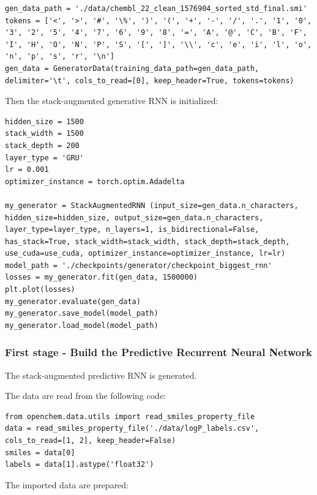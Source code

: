\documentclass[a4paper]{article}
\begin{document}
\begin{lstlisting}
gen_data_path = './data/chembl_22_clean_1576904_sorted_std_final.smi'
tokens = ['<', '>', '#', '\%', ')', '(', '+', '-', '/', '.', '1', '0', '3', '2', '5', '4', '7', '6', '9', '8', '=', 'A', '@', 'C', 'B', 'F', 'I', 'H', 'O', 'N', 'P', 'S', '[', ']', '\\', 'c', 'e', 'i', 'l', 'o', 'n', 'p', 's', 'r', '\n']
gen_data = GeneratorData(training_data_path=gen_data_path, delimiter='\t', cols_to_read=[0], keep_header=True, tokens=tokens)
\end{lstlisting}

Then the stack-augmented generative RNN is initialized:

\begin{lstlisting}
hidden_size = 1500
stack_width = 1500
stack_depth = 200
layer_type = 'GRU'
lr = 0.001
optimizer_instance = torch.optim.Adadelta

my_generator = StackAugmentedRNN (input_size=gen_data.n_characters, hidden_size=hidden_size, output_size=gen_data.n_characters, layer_type=layer_type, n_layers=1, is_bidirectional=False, has_stack=True, stack_width=stack_width, stack_depth=stack_depth, use_cuda=use_cuda, optimizer_instance=optimizer_instance, lr=lr)
model_path = './checkpoints/generator/checkpoint_biggest_rnn'
losses = my_generator.fit(gen_data, 1500000)
plt.plot(losses)
my_generator.evaluate(gen_data)
my_generator.save_model(model_path)
my_generator.load_model(model_path)
\end{lstlisting}

\subsubsection{First stage - Build the Predictive Recurrent Neural Network}\label{sec:First stage - Build the Predictive Recurrent Neural Network}

The stack-augmented predictive RNN is generated. 

The data are read from the following code:

\begin{lstlisting}
from openchem.data.utils import read_smiles_property_file
data = read_smiles_property_file('./data/logP_labels.csv', cols_to_read=[1, 2], keep_header=False)
smiles = data[0]
labels = data[1].astype('float32')
\end{lstlisting}

The imported data are prepared:
\end{document}
